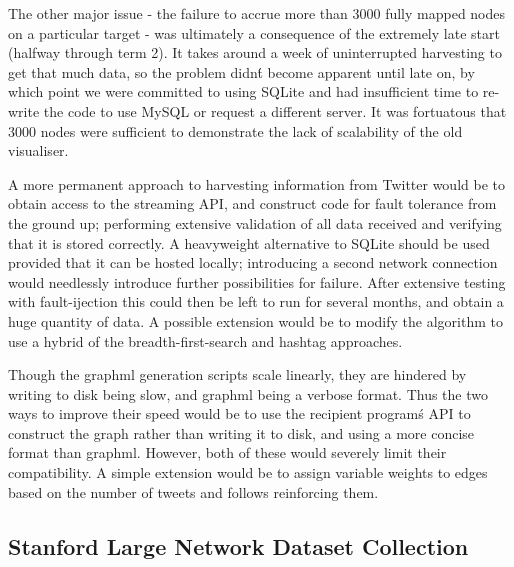 The other major issue - the failure to accrue more than 3000 fully mapped nodes on a particular target - was ultimately a consequence of the extremely late start (halfway through term 2). It takes around a week of uninterrupted harvesting to get that much data, so the problem didn\'t become apparent until late on, by which point we were committed to using SQLite and had insufficient time to re-write the code to use MySQL or request a different server. It was fortuatous that 3000 nodes were sufficient to demonstrate the lack of scalability of the old visualiser.

A more permanent approach to harvesting information from Twitter would be to obtain access to the streaming API, and construct code for fault tolerance from the ground up; performing extensive validation of all data received and verifying that it is stored correctly. A heavyweight alternative to SQLite should be used provided that it can be hosted locally; introducing a second network connection would needlessly introduce further possibilities for failure. After extensive testing with fault-ijection this could then be left to run for several months, and obtain a huge quantity of data. A possible extension would be to modify the algorithm to use a hybrid of the breadth-first-search and hashtag approaches.

Though the graphml generation scripts scale linearly, they are hindered by writing to disk being slow, and graphml being a verbose format. Thus the two ways to improve their speed would be to use the recipient program\'s API to construct the graph rather than writing it to disk, and using a more concise format than graphml. However, both of these would severely limit their compatibility. A simple extension would be to assign variable weights to edges based on the number of tweets and follows reinforcing them.

\subsection{Stanford Large Network Dataset Collection}